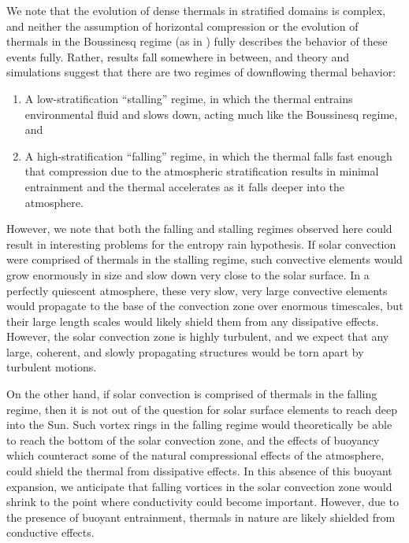 \documentclass[twocolumn, amsmath, amsfonts, amssymb, trackchanges]{aastex62}
\newcommand{\LJ}{\citetalias{lecoanet&jeevanjee2018}}
\begin{document}
We note that the evolution of dense thermals in stratified domains is complex, and neither the assumption of horizontal compression \citep[as in e.g.,][]{brandenburg2016} or the evolution of thermals in the Boussinesq regime (as in \LJ) fully describes the behavior of these events fully.
Rather, results fall somewhere in between, and theory and simulations suggest that there are two regimes of downflowing thermal behavior:
\begin{enumerate}
\item A low-stratification ``stalling'' regime, in which the thermal entrains environmental fluid and slows down, acting much like the Boussinesq regime, and
\item A high-stratification ``falling'' regime, in which the thermal falls fast enough that compression due to the atmospheric stratification results in minimal entrainment and the thermal accelerates as it falls deeper into the atmosphere.
\end{enumerate}

However, we note that both the falling and stalling regimes observed here could result in interesting problems for the entropy rain hypothesis. 
If solar convection were comprised of thermals in the stalling regime, such convective elements would grow enormously in size and slow down very close to the solar surface.
In a perfectly quiescent atmosphere, these very slow, very large convective elements would propagate to the base of the convection zone over enormous timescales, but their large length scales would likely shield them from any dissipative effects.
However, the solar convection zone is highly turbulent, and we expect that any large, coherent, and slowly propagating structures would be torn apart by turbulent motions.

On the other hand, if solar convection is comprised of thermals in the falling regime, then it is not out of the question for solar surface elements to reach deep into the Sun.
Such vortex rings in the falling regime would theoretically be able to reach the bottom of the solar convection zone, and the effects of buoyancy which counteract some of the natural compressional effects of the atmosphere, could shield the thermal from dissipative effects.
In this absence of this buoyant expansion, we anticipate that falling vortices in the solar convection zone would shrink to the point where conductivity could become important.
However, due to the presence of buoyant entrainment, thermals in nature are likely shielded from conductive effects.
\end{document}
